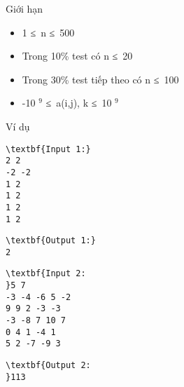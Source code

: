 Giới hạn
\begin{itemize}
	\item 1 ≤ n ≤ 500
	\item Trong 10\% test có n ≤ 20
	\item Trong 30\% test tiếp theo có n ≤ 100
	\item -10 $^ 9 $ ≤ a(i,j), k ≤ 10 $^ 9 $
\end{itemize}
Ví dụ
\begin{itemize}
\end{itemize}
\begin{verbatim}
\textbf{Input 1:}
2 2
-2 -2
1 2
1 2
1 2
1 2 \end{verbatim}
\begin{verbatim}
\textbf{Output 1:}
2
\end{verbatim}
\begin{verbatim}
\textbf{Input 2:
}5 7
-3 -4 -6 5 -2
9 9 2 -3 -3
-3 -8 7 10 7
0 4 1 -4 1
5 2 -7 -9 3
\end{verbatim}
\begin{verbatim}
\textbf{Output 2:
}113\end{verbatim}